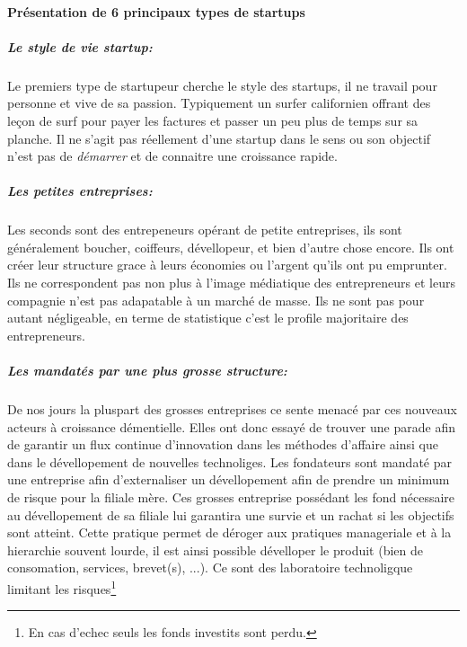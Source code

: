 \documentclass[11pt, a4paper ]{article}
\begin{document}
\begin{spacing}{1.5}
		\paragraph{Présentation de 6 principaux\cite{typeStartup} types de startups}

			\subparagraph{Le style de vie startup:} %
Le premiers type de startupeur cherche le style des startups, il ne travail pour personne et vive de sa passion. Typiquement un surfer californien offrant des leçon de surf pour payer les factures et passer un peu plus de temps sur sa planche. Il ne s'agit pas réellement d'une startup dans le sens ou son objectif n'est pas de \emph{démarrer} et de connaitre une croissance rapide.

			\subparagraph{Les petites entreprises:} %
Les seconds sont des entrepeneurs opérant de petite entreprises, ils sont généralement boucher, coiffeurs, dévellopeur, et bien d'autre chose encore. Ils ont créer leur structure grace à leurs économies ou l'argent qu'ils ont pu emprunter. Ils ne correspondent pas non plus à l'image médiatique des entrepreneurs et leurs compagnie n'est pas adapatable à un marché de masse. Ils ne sont pas pour autant négligeable, en terme de statistique c'est le profile majoritaire des entrepreneurs.

			\subparagraph{Les mandatés par une plus grosse structure:} %
De nos jours la pluspart des grosses entreprises ce sente menacé par ces nouveaux acteurs à croissance démentielle. Elles ont donc essayé de trouver une parade afin de garantir un flux continue d'innovation dans les méthodes d'affaire ainsi que dans le dévellopement de nouvelles technoliges. Les fondateurs sont mandaté par une entreprise afin d'externaliser un dévellopement afin de prendre un minimum de risque pour la filiale mère. Ces grosses entreprise possédant les fond nécessaire au dévellopement de sa filiale lui garantira une survie et un rachat si les objectifs sont atteint. Cette pratique permet de déroger aux pratiques manageriale et à la hierarchie souvent lourde, il est ainsi possible dévelloper le produit (bien de consomation, services, brevet(s), ...). Ce sont des laboratoire technoligque limitant les risques\footnote{En cas d'echec seuls les fonds investits sont perdu.}


\end{spacing}
\end{document}
